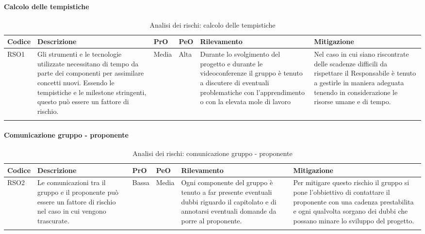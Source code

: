 \paragraph{Calcolo delle tempistiche}
\begin{center}

	\begin{longtable}{p{1cm}|p{4cm}|p{0.7cm}|p{0.7cm}|p{3cm}|p{4cm}}
		\arrayrulecolor{white}
		\hline
		\rowcolor{blue!20}
		\textbf{Codice} & 
		\textbf{Descrizione} &
		\textbf{PrO}  &
		\textbf{PeO}  &				        
		\textbf{Rilevamento} &
		\textbf{Mitigazione} \\
		\hline			
		RSO1 & Gli strumenti e le tecnologie utilizzate necessitano di tempo da parte dei componenti per assimilare concetti nuovi. Essendo le tempistiche e le milestone stringenti, questo può essere un fattore di rischio. & Media & Alta & Durante lo svolgimento del progetto e durante le videoconferenze il gruppo è tenuto a discutere di eventuali problematiche con l'apprendimento o con la elevata mole di lavoro & Nel caso in cui siano riscontrate delle scadenze difficili da rispettare il Responsabile è tenuto a gestirle in maniera adeguata tenendo in considerazione le risorse umane e di tempo. \\
		
		\caption{Analisi dei rischi: calcolo delle tempistiche}
	\end{longtable}
\end{center}

\paragraph{Comunicazione gruppo - proponente}
\begin{center}

	\begin{longtable}{p{1cm}|p{4cm}|p{0.7cm}|p{0.7cm}|p{3cm}|p{4cm}}
		\arrayrulecolor{white}
		\hline
		\rowcolor{blue!20}
		\textbf{Codice} & 
		\textbf{Descrizione} &
		\textbf{PrO}  &
		\textbf{PeO}  &				        
		\textbf{Rilevamento} &
		\textbf{Mitigazione} \\
		\hline	
		RSO2 & Le comunicazioni tra il gruppo e il proponente può essere un fattore di rischio nel caso in cui vengono trascurate. & Bassa & Media & Ogni componente del gruppo è tenuto a far presente eventuali dubbi riguardo il capitolato e di annotarsi eventuali domande da porre al proponente. & Per mitigare questo rischio il gruppo si pone l'obbiettivo di contattare il proponente con una cadenza prestabilita e ogni qualvolta sorgano dei dubbi che possano minare lo sviluppo del progetto.  \\
		
		\caption{Analisi dei rischi: comunicazione gruppo - proponente}
	\end{longtable}
\end{center}
\newpage

